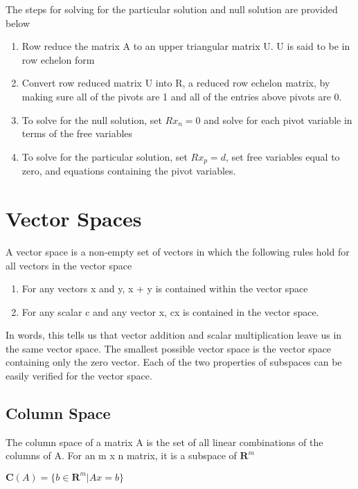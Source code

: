 \documentclass{article}
\begin{document}
The steps for solving for the particular solution and null solution are provided below 
\begin{enumerate}
    \item Row reduce the matrix A to an upper triangular matrix U. U is said to be in row echelon form

    \item Convert row reduced matrix U into R, a reduced row echelon matrix, by making sure all of the pivots are 1 and all of the entries above pivots are 0.

    \item To solve for the null solution, set $Rx_n = 0$ and solve for each pivot variable in terms of the free variables

    \item To solve for the particular solution, set $Rx_p = d$, set free variables equal to zero, and equations containing the pivot variables.
    
\end{enumerate}




\section{Vector Spaces}
A vector space is a non-empty set of vectors in which the following rules hold for all vectors in the vector space

\begin{enumerate}
    \item For any vectors x and y, x + y is contained within the vector space

    \item For any scalar c and any vector x, cx is contained in the vector space.
\end{enumerate}
In words, this tells us that vector addition and scalar multiplication leave us in the same vector space. The smallest possible vector space is the vector space containing only the zero vector. Each of the two properties of subspaces can be easily verified for the vector space. 

\subsection{Column Space}
The column space of a matrix A is the set of all linear combinations of the columns of A. For an m x n matrix, it is a subspace of $\textbf{R}^m$

$\textbf{C}(A) = \{ b \in \textbf{R}^m | Ax = b \}$
\end{document}
